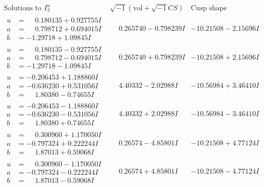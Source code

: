 \documentclass[1p]{elsarticle_modified}
\theoremstyle{definition}
\newcommand{\I}{\sqrt{-1}}
\begin{document}
$$\begin{array}{c|c|c}  
\text{Solutions to }I^u_{3}& \I (\text{vol} + \sqrt{-1}CS) & \text{Cusp shape}\\
 \hline 
\begin{aligned}
u &= \phantom{-}0.180135 + 0.927755 I \\
a &= \phantom{-}0.798712 + 0.694015 I \\
b &= -1.29718 + 1.09845 I\end{aligned}
 & \phantom{-}0.265740 - 0.798239 I & -10.21508 - 2.15696 I \\ \hline\begin{aligned}
u &= \phantom{-}0.180135 - 0.927755 I \\
a &= \phantom{-}0.798712 - 0.694015 I \\
b &= -1.29718 - 1.09845 I\end{aligned}
 & \phantom{-}0.265740 + 0.798239 I & -10.21508 + 2.15696 I \\ \hline\begin{aligned}
u &= -0.206453 + 1.188860 I \\
a &= -0.636230 + 0.531056 I \\
b &= \phantom{-}1.80380 - 0.74655 I\end{aligned}
 & \phantom{-}4.40332 - 2.02988 I & -10.56984 + 3.46410 I \\ \hline\begin{aligned}
u &= -0.206453 - 1.188860 I \\
a &= -0.636230 - 0.531056 I \\
b &= \phantom{-}1.80380 + 0.74655 I\end{aligned}
 & \phantom{-}4.40332 + 2.02988 I & -10.56984 - 3.46410 I \\ \hline\begin{aligned}
u &= \phantom{-}0.300960 + 1.170050 I \\
a &= -0.797324 + 0.222244 I \\
b &= \phantom{-}1.87013 + 0.59068 I\end{aligned}
 & \phantom{-}0.26574 - 4.85801 I & -10.21508 + 4.77124 I \\ \hline\begin{aligned}
u &= \phantom{-}0.300960 - 1.170050 I \\
a &= -0.797324 - 0.222244 I \\
b &= \phantom{-}1.87013 - 0.59068 I\end{aligned}
 & \phantom{-}0.26574 + 4.85801 I & -10.21508 - 4.77124 I \\ \hline\begin{aligned}

\end{aligned}
\end{array}$$
\end{document}
